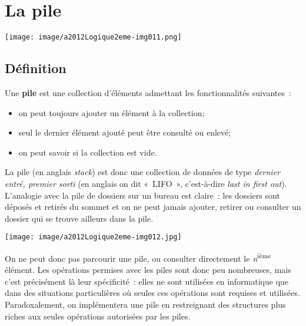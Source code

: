 \chapter{La pile}

\begin{center}
	\texttt{[image: image/a2012Logique2eme-img011.png]}
\end{center}
	

\section{Définition}
	
	Une \textbf{pile} est une collection d'éléments admettant 
	les fonctionnalités suivantes~:

	\begin{itemize}
		\item {
			on peut toujours ajouter un élément à la collection;}
		\item {
			seul le dernier élément ajouté peut être consulté ou enlevé;}
		\item {
			on peut savoir si la collection est vide.}
	\end{itemize}

	La pile (en anglais \textit{stack}) est donc une collection 
	de données de type \textit{dernier entré, premier sorti} (en
	anglais on dit «~LIFO~», c'est-à-dire \textit{last in first out}). 
	L'analogie avec la pile de dossiers sur un bureau
	est claire~: les dossiers sont déposés et retirés du sommet 
	et on ne peut jamais ajouter, retirer ou consulter un dossier 
	qui se trouve ailleurs dans la pile.
	
	\begin{center}
	\texttt{[image: image/a2012Logique2eme-img012.jpg]}
	\end{center}
	
	On ne peut donc pas parcourir une pile, ou consulter directement 
	le \textit{n}\textsuperscript{ième} élément. Les opérations permises
	avec les piles sont donc peu nombreuses, mais c'est précisément 
	là leur spécificité~: elles ne sont utilisées en
	informatique que dans des situations particulières où seules 
	ces opérations sont requises et utilisées. Paradoxalement,
	on implémentera une pile en restreignant des structures plus 
	riches aux seules opérations autorisées par les piles.
	
